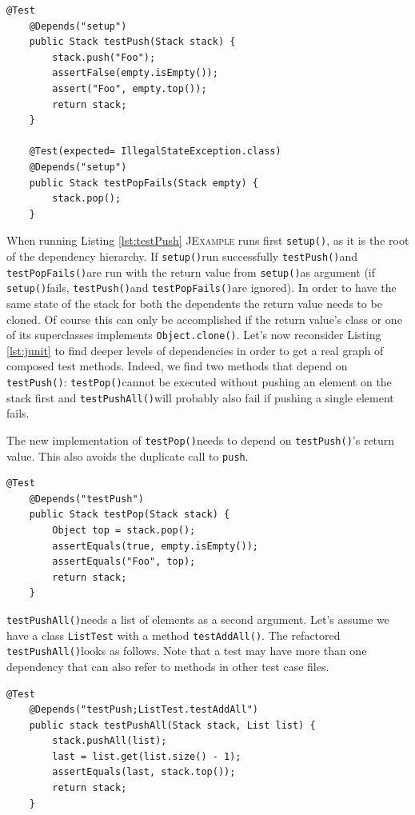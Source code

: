 \documentclass[11pt]{article}
\newcommand{\JExample}{\textsc{JExample}\xspace}
\newcommand{\ttt}[1]{\texttt{#1}}
\newcommand{\setup}{\ttt{setup()}}
\newcommand{\testPush}{\ttt{testPush()}}
\newcommand{\testPushAll}{\ttt{testPushAll()}}
\newcommand{\testPop}{\ttt{testPop()}}
\newcommand{\testPopFails}{\ttt{testPopFails()}}
\begin{document}
\begin{lstlisting}[label=lst:testpush,caption=Take another test's result as input value.]
    @Test
    @Depends("setup")
    public Stack testPush(Stack stack) {
        stack.push("Foo");
        assertFalse(empty.isEmpty());
        assert("Foo", empty.top());
        return stack;
    }

    @Test(expected= IllegalStateException.class)
    @Depends("setup")
    public Stack testPopFails(Stack empty) {
        stack.pop();
    }
\end{lstlisting}

When running Listing \ref{lst:testPush} \JExample runs first \setup, as it is the root of the dependency hierarchy. If \setup run successfully \testPush and \testPopFails are run with the return value from \setup as argument (if \setup fails, \testPush and \testPopFails are ignored).
In order to have the same state of the stack for both the dependents the return value needs to be cloned. Of course this can only be accomplished if the return value's class or one of its superclasses implements \verb|Object.clone()|.
Let's now reconsider Listing \ref{lst:junit} to find deeper levels of dependencies in order to get a real graph of composed test methods.
Indeed, we find two methods that depend on \testPush: \testPop cannot be executed without pushing an element on the stack first and \testPushAll will probably also fail if pushing a single element fails.

The new implementation of \testPop needs to depend on \testPush's return value. This also avoids the duplicate call to \ttt{push}.

\begin{lstlisting}[label=lst:testpop,caption=Avoid code duplication using dependencies.]
    @Test
    @Depends("testPush")
    public Stack testPop(Stack stack) {
        Object top = stack.pop();
        assertEquals(true, empty.isEmpty());
        assertEquals("Foo", top);
        return stack;
    }
\end{lstlisting}

\testPushAll needs a list of elements as a second argument. Let's assume we have a class \ttt{ListTest} with a method \ttt{testAddAll()}. The refactored \testPushAll looks as follows. Note that a test may have more than one dependency that can also refer to methods in other test case files.

\begin{lstlisting}[label=lst:testpushall,caption=A test may have multiple dependencies.]
    @Test
    @Depends("testPush;ListTest.testAddAll")
    public stack testPushAll(Stack stack, List list) {
        stack.pushAll(list);
        last = list.get(list.size() - 1);
        assertEquals(last, stack.top());
        return stack;
    }
\end{lstlisting}
\end{document}
